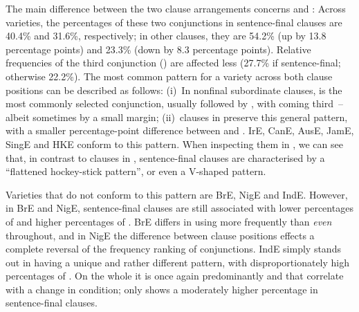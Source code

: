 The main difference between the two clause arrangements concerns  and : Across varieties, the percentages of these two conjunctions in sentence-final clauses are 40.4\% and 31.6\%, respectively; in other clauses, they are 54.2\% (up by 13.8 percentage points) and 23.3\% (down by 8.3 percentage points). Relative frequencies of the third conjunction () are affected less (27.7\% if sentence-final; otherwise 22.2\%). The most common pattern for a variety across both clause positions can be described as follows:
(i)~In nonfinal subordinate clauses,  is the most commonly selected conjunction, usually followed by , with  coming third~– albeit sometimes by a small margin;
(ii)~clauses in  preserve this general pattern, with a smaller percentage-point difference between  and . IrE, CanE, AusE, JamE, SingE and HKE conform to this pattern. When inspecting them in , we can see that, in contrast to clauses in , sentence-final clauses are characterised by a “flattened hockey-stick pattern”, or even a V-shaped pattern.

Varieties that do not conform to this pattern are BrE, NigE and IndE. However, in BrE and NigE, sentence-final clauses are still associated with lower percentages of  and higher percentages of . BrE differs in using  more frequently than \textit{even}  throughout, and in NigE the difference between clause positions effects a complete reversal of the frequency ranking of conjunctions. IndE simply stands out in having a unique and rather different pattern, with disproportionately high percentages of . On the whole it is once again predominantly  and  that correlate with a change in condition;  only shows a moderately higher percentage in sentence-final clauses.

